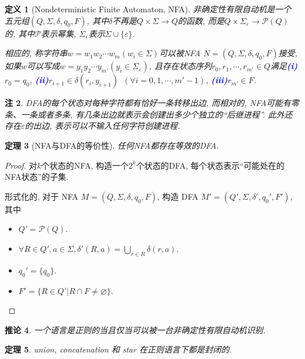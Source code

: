 \documentclass[8pt]{article}
\theoremstyle{compact}
\newtheorem{theorem}{定理}[section]
\newtheorem{definition}[theorem]{定义}
\newtheorem{corollary}[theorem]{推论}
\newtheorem{remark}[theorem]{注}
\def\num#1{\textnormal{\textbf{\mbox{\textcolor{blue}{(#1)}}}}}
\begin{document}
\begin{definition}[Nondeterministic Finite Automaton, NFA]
	非确定性有限自动机是一个五元组$(Q, \Sigma, \delta, q_0, F)$, 其中$\delta$不再是$Q \times \Sigma \to Q$的函数, 而是$Q \times \Sigma_{\varepsilon} \to \mathcal P(Q)$的, 其中$\mathcal P$表示幂集, $\Sigma_{\varepsilon}$表示$\Sigma \cup \{\varepsilon\}$. 

	相应的, 称字符串$w = w_1w_2\cdots w_m(w_i \in \Sigma)$可以被NFA $N = (Q, \Sigma, \delta, q_0, F)$接受, 如果$w$可以写成$w = y_1y_2\cdots y_{m'}(y_i \in \Sigma_{\varepsilon})$, 且存在状态序列$r_0, r_1, \cdots, r_{m'} \in Q$满足\num{i}$r_0 = q_0$, \num{ii}$r_{i+1} \in \delta(r_i, y_{i+1})$\ $(\forall i = 0, 1, \cdots, {m'}-1)$, \num{iii}$r_{m'} \in F$. 
\end{definition}
\begin{remark}
	DFA的每个状态对每种字符都有恰好一条转移出边, 而相对的, NFA可能有零条、一条或者多条, 有几条出边就表示会创建出多少个独立的“后继进程”. 此外还存在$\varepsilon$的出边, 表示可以不输入任何字符创建进程. 
\end{remark}
\begin{theorem}[NFA与DFA的等价性]
	任何NFA都存在等效的DFA. 
\end{theorem}
\begin{proof}
	对$k$个状态的NFA, 构造一个$2^k$个状态的DFA, 每个状态表示“可能处在的NFA状态”的子集. 

	形式化的, 对于 NFA $M = (Q, \Sigma, \delta, q_0, F)$, 构造 DFA $M' = (Q', \Sigma, \delta', q_0', F')$, 其中
	\begin{itemize}
		\item $Q' = \mathcal P(Q)$.
		\item $\forall R \in Q', a \in \Sigma, \delta'(R, a) = \bigcup_{r \in R}\delta(r, a)$.
		\item $q_0' = \{q_0\}$.
		\item $F' = \{R \in Q' | R \cap F \neq \varnothing\}$.
	\end{itemize}
\end{proof}
\begin{corollary}
	一个语言是正则的当且仅当可以被一台非确定性有限自动机识别. 
\end{corollary}
\begin{theorem}
	union, concatenation 和 star 在正则语言下都是封闭的. 
\end{theorem}
\end{document}
